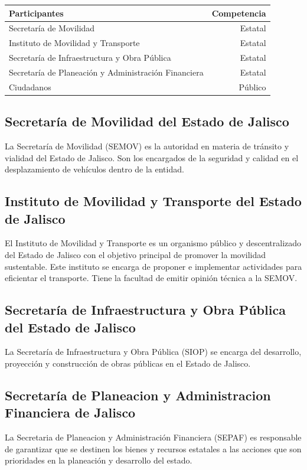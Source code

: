 \documentclass{article}
\begin{document}
\begin{table}[H]\centering
\begin{tabular}{l r}
\hline
Participantes & Competencia \\
\hline\hline
Secretaría de Movilidad & Estatal \\
Instituto de Movilidad y Transporte & Estatal \\
Secretaría de Infraestructura y Obra Pública & Estatal \\
Secretaría de Planeación y Administración Financiera & Estatal\\
Ciudadanos & Público \\

\hline
\end{tabular}
\end{table}

\subsection[SEMOV]{Secretaría de Movilidad del Estado de Jalisco}\label{subsec:semov}

La Secretaría de Movilidad (SEMOV) es la autoridad en materia de tránsito y vialidad del Estado de Jalisco. Son los encargados de la seguridad y calidad en el desplazamiento de vehículos dentro de la entidad. 

\subsection[IMTJ]{Instituto de Movilidad y Transporte del Estado de Jalisco}\label{subsec:imtj}

El Instituto de Movilidad y Transporte es un organismo público y descentralizado del Estado de Jalisco con el objetivo principal de promover la movilidad sustentable. Este instituto se encarga de proponer e implementar actividades para eficientar el transporte. Tiene la facultad de emitir opinión técnica a la SEMOV. 

\subsection[SIOP]{Secretaría de Infraestructura y Obra Pública del Estado de Jalisco}\label{subsec:siop}

La Secretaría de Infraestructura y Obra Pública (SIOP) se encarga del desarrollo, proyección y construcción de obras públicas en el Estado de Jalisco. 

\subsection[SEPAF]{Secretaría de Planeacion y Administracion Financiera de Jalisco}\label{subsec:sepaf}
La Secretaria de Planeacion y Administración Financiera (SEPAF) es responsable de garantizar que se destinen los bienes y recursos estatales a las acciones que son prioridades en la planeación y desarrollo del estado. 
\end{document}
